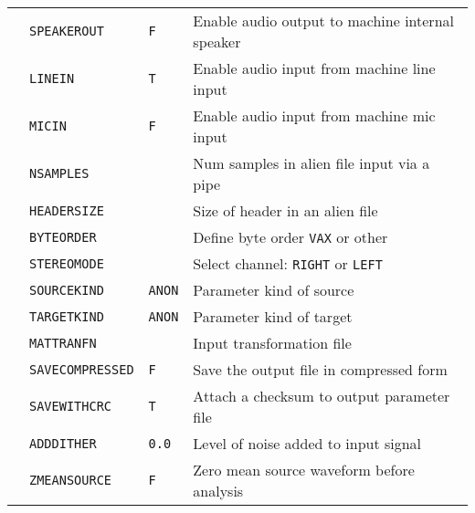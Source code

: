 \begin{center}
\begin{supertabular}{|p{1.8cm}|l|l|p{6.6cm}|}


  & \texttt{SPEAKEROUT} & \texttt{F}& Enable audio output to machine internal speaker \\ 


  & \texttt{LINEIN} & \texttt{T} & Enable audio input from machine line input \\ 


  & \texttt{MICIN}  & \texttt{F} & Enable audio input from machine mic input \\ \hline







  & \texttt{NSAMPLES} &  & Num samples in alien file input via a pipe\\ 


 & \texttt{HEADERSIZE}  &   & Size of header in an alien file\\ 


  & \texttt{BYTEORDER} &   & Define byte order \texttt{VAX} or other\\ 


  & \texttt{STEREOMODE} &   & Select channel: \texttt{RIGHT} or \texttt{LEFT} \\ \hline







  & \texttt{SOURCEKIND} & \texttt{ANON} & Parameter kind of source \\ 


  & \texttt{TARGETKIND} & \texttt{ANON} & Parameter kind of target \\ 


  & \texttt{MATTRANFN } &  & Input transformation file  \\ 


  & \texttt{SAVECOMPRESSED} & \texttt{F} & Save the output file in compressed form \\ 


  & \texttt{SAVEWITHCRC} & \texttt{T} & Attach a checksum to output parameter file \\ 




  & \texttt{ADDDITHER} & \texttt{0.0} & Level of noise added to input signal \\  


  & \texttt{ZMEANSOURCE} & \texttt{F} & Zero mean source waveform before analysis \\ 



\end{supertabular}
\end{center}
